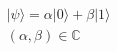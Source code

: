 \documentclass[preview]{standalone}
\begin{document}
\begin{align*}
&| \psi \rangle = \alpha | 0 \rangle + \beta | 1 \rangle \\ & (\alpha, \beta) \in \mathbb{C}
\end{align*}
\end{document}
